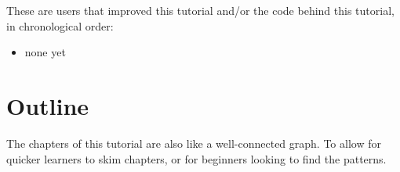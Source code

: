 These are users that improved this tutorial and/or the code behind this
tutorial, in chronological order:

\begin{itemize}
  \item none yet
\end{itemize}

\section{Outline}

The chapters of this tutorial are also like a well-connected graph.
To allow for quicker learners to skim chapters, or for beginners looking
to find the patterns.
